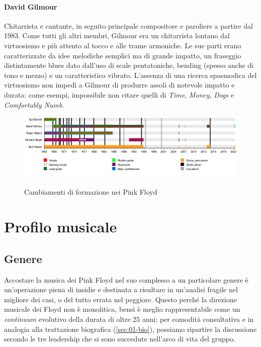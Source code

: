 \documentclass[class=book, crop=false, oneside, 12pt]{standalone}
\begin{document}
    \paragraph{David Gilmour}
    Chitarrista e cantante, in seguito principale compositore e paroliere a partire dal 1983. Come tutti gli altri membri, Gilmour era un chitarrista lontano dal virtuosismo e più attento al tocco e alle trame armoniche. Le sue parti erano caratterizzate da idee melodiche semplici ma di grande impatto, un fraseggio distintamente blues dato dall'uso di scale pentatoniche, bending (spesso anche di tono e mezzo) e un caratteristico vibrato. L'assenza di una ricerca spasmodica del virtuosismo non impedì a Gilmour di produrre assoli di notevole impatto e durata: come esempi, impossibile non citare quelli di \emph{Time}, \emph{Money}, \emph{Dogs} e \emph{Comfortably Numb}.

    \begin{figure}[H]
        \includegraphics[keepaspectratio, width=\textwidth]{pinkfloyd-timeline.png}
        \label{fig:01-pinkfloyd-timeline}
        \caption{Cambiamenti di formazione nei Pink Floyd}
    \end{figure}
    
    \section{Profilo musicale}
    
    \subsection{Genere}
    Accostare la musica dei Pink Floyd nel suo complesso a un particolare genere è un'operazione piena di insidie e destinata a risultare in un'analisi fragile nel migliore dei casi, o del tutto errata nel peggiore. Questo perché la direzione musicale dei Floyd non è monolitica, bensì è meglio rappresentabile come un \emph{continuum} evolutivo della durata di oltre 25 anni; per comodità consultativa e in analogia alla trattazione biografica (\ref{sec:01-bio}), possiamo ripartire la discussione secondo le tre leadership che si sono succedute nell'arco di vita del gruppo.
\end{document}
